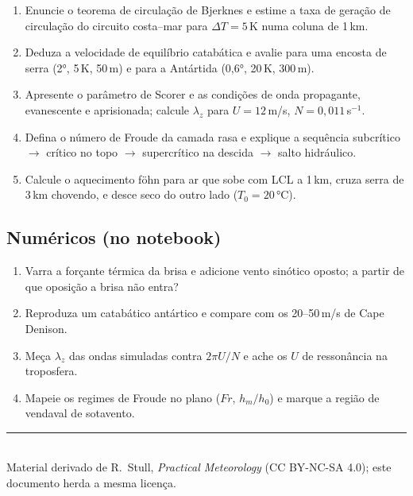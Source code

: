 \documentclass[11pt]{article}
\begin{document}
\begin{enumerate}[label=\textbf{T\arabic*.},itemsep=4pt]
  \item Enuncie o teorema de circulação de Bjerknes e estime a taxa de
        geração de circulação do circuito costa--mar para
        $\Delta T = 5$\,K numa coluna de 1\,km.
  \item Deduza a velocidade de equilíbrio catabática e avalie para uma
        encosta de serra (2°, 5\,K, 50\,m) e para a Antártida
        (0{,}6°, 20\,K, 300\,m).
  \item Apresente o parâmetro de Scorer e as condições de onda
        propagante, evanescente e aprisionada; calcule $\lambda_z$
        para $U = 12$\,m/s, $N = 0{,}011$\,s$^{-1}$.
  \item Defina o número de Froude da camada rasa e explique a
        sequência subcrítico $\to$ crítico no topo $\to$ supercrítico
        na descida $\to$ salto hidráulico.
  \item Calcule o aquecimento föhn para ar que sobe com LCL a 1\,km,
        cruza serra de 3\,km chovendo, e desce seco do outro lado
        ($T_0 = 20\,°$C).
\end{enumerate}

\subsection*{Numéricos (no notebook)}

\begin{enumerate}[label=\textbf{N\arabic*.},itemsep=4pt]
  \item Varra a forçante térmica da brisa e adicione vento sinótico
        oposto; a partir de que oposição a brisa não entra?
  \item Reproduza um catabático antártico e compare com os
        20--50\,m/s de Cape Denison.
  \item Meça $\lambda_z$ das ondas simuladas contra $2\pi U/N$ e ache
        os $U$ de ressonância na troposfera.
  \item Mapeie os regimes de Froude no plano ($Fr$, $h_m/h_0$) e
        marque a região de vendaval de sotavento.
\end{enumerate}

\vspace{1em}
\noindent\rule{\linewidth}{0.4pt}\\
{\scriptsize Material derivado de R.~Stull, \emph{Practical Meteorology}
(CC BY-NC-SA 4.0); este documento herda a mesma licença.}
\end{document}
